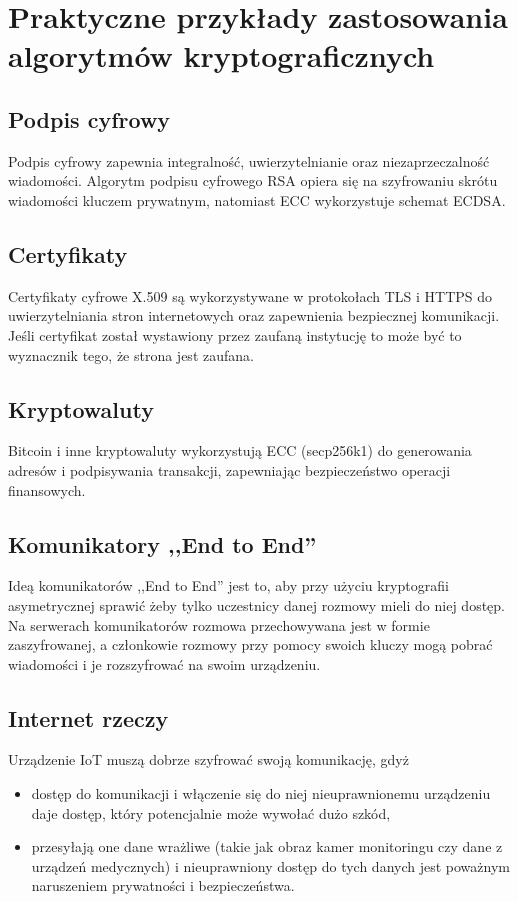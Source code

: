 \documentclass[conference]{IEEEtran}
\begin{document}
\section{Praktyczne przykłady zastosowania algorytmów kryptograficznych}
\subsection{Podpis cyfrowy}
Podpis cyfrowy zapewnia integralność, uwierzytelnianie oraz niezaprzeczalność wiadomości. Algorytm podpisu cyfrowego RSA opiera się na szyfrowaniu skrótu wiadomości kluczem prywatnym, natomiast ECC wykorzystuje schemat ECDSA.
\subsection{Certyfikaty}
Certyfikaty cyfrowe X.509 są wykorzystywane w protokołach TLS i HTTPS do uwierzytelniania stron internetowych oraz zapewnienia bezpiecznej komunikacji. Jeśli certyfikat został wystawiony przez zaufaną instytucję to może być to wyznacznik tego, że strona jest zaufana.
\subsection{Kryptowaluty}
Bitcoin i inne kryptowaluty wykorzystują ECC (secp256k1) do generowania adresów i podpisywania transakcji, zapewniając bezpieczeństwo operacji finansowych.
\subsection{Komunikatory ,,End to End''}
Ideą komunikatorów ,,End to End'' jest to, aby przy użyciu kryptografii asymetrycznej sprawić żeby tylko uczestnicy danej rozmowy mieli do niej dostęp. Na serwerach komunikatorów rozmowa przechowywana jest w formie zaszyfrowanej, a członkowie rozmowy przy pomocy swoich kluczy mogą pobrać wiadomości i je rozszyfrować na swoim urządzeniu.
\subsection{Internet rzeczy}
Urządzenie IoT muszą dobrze szyfrować swoją komunikację, gdyż
\begin{itemize}
    \item dostęp do komunikacji i włączenie się do niej nieuprawnionemu urządzeniu daje dostęp, który potencjalnie może wywołać dużo szkód,
    \item przesyłają one dane wrażliwe (takie jak obraz kamer monitoringu czy dane z urządzeń medycznych) i nieuprawniony dostęp do tych danych jest poważnym naruszeniem prywatności i bezpieczeństwa.
\end{itemize}
\end{document}
